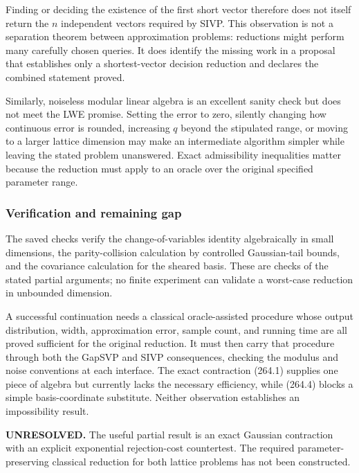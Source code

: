 \documentclass[11pt]{article}
\begin{document}
Finding or deciding the existence of the first short vector therefore does not itself return the $n$ independent vectors required by SIVP. This observation is not a separation theorem between approximation problems: reductions might perform many carefully chosen queries. It does identify the missing work in a proposal that establishes only a shortest-vector decision reduction and declares the combined statement proved.

Similarly, noiseless modular linear algebra is an excellent sanity check but does not meet the LWE promise. Setting the error to zero, silently changing how continuous error is rounded, increasing $q$ beyond the stipulated range, or moving to a larger lattice dimension may make an intermediate algorithm simpler while leaving the stated problem unanswered. Exact admissibility inequalities matter because the reduction must apply to an oracle over the original specified parameter range.

\subsubsection{Verification and remaining gap}
The saved checks verify the change-of-variables identity algebraically in small dimensions, the parity-collision calculation by controlled Gaussian-tail bounds, and the covariance calculation for the sheared basis. These are checks of the stated partial arguments; no finite experiment can validate a worst-case reduction in unbounded dimension.

A successful continuation needs a classical oracle-assisted procedure whose output distribution, width, approximation error, sample count, and running time are all proved sufficient for the original reduction. It must then carry that procedure through both the GapSVP and SIVP consequences, checking the modulus and noise conventions at each interface. The exact contraction (264.1) supplies one piece of algebra but currently lacks the necessary efficiency, while (264.4) blocks a simple basis-coordinate substitute. Neither observation establishes an impossibility result.

\textbf{UNRESOLVED.} The useful partial result is an exact Gaussian contraction with an explicit exponential rejection-cost countertest. The required parameter-preserving classical reduction for both lattice problems has not been constructed.
\end{document}

